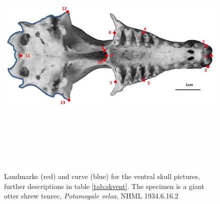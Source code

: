 \begin{figure}[!htb] 
  \centering
  \includegraphics[width=12cm, height=12cm, keepaspectratio=true]{Methods/figures/skvent_landmarks_pot_vel.jpg}
    \caption[Skulls: ventral landmarks]
    {Landmarks (red) and curve (blue) for the ventral skull pictures, further descriptions in table \ref{tab:skvent}. The specimen is a giant otter shrew tenrec, \textit{Potamogale velox}, NHML 1934.6.16.2}
  \label{fig:skvent_landmarks}
  \end{figure}

\bigskip

\begin{table}[!htb] %
\caption[Skulls: ventral landmarks]
		{Descriptions of the landmarks (points) and curves (semilandmarks) for the skulls in ventral view (figure \ref{fig:skvent_landmarks})} 

\label{tab:skvent}
\end{table}
\newpage
